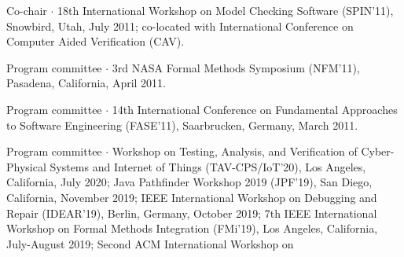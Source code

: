 \documentclass[ComputerScience]{vita}
\begin{document}
\begin{vita}
\begin{Panel and Committee Service}
\item Co-chair $\cdot$ 18th International Workshop on Model Checking Software (SPIN'11), Snowbird, Utah, July 2011; co-located with International Conference on Computer Aided Verification (CAV).
\item Program committee $\cdot$ 3rd NASA Formal Methods Symposium (NFM'11), Pasadena, California, April 2011. 
\item Program committee $\cdot$ 14th International Conference on Fundamental Approaches to Software Engineering (FASE'11), Saarbrucken, Germany, March 2011.
\item Program committee $\cdot$  Workshop on Testing, Analysis, and Verification of Cyber-Physical Systems and Internet of Things (TAV-CPS/IoT'20), Los Angeles, California, July 2020; 
Java Pathfinder Workshop 2019 (JPF'19), San Diego, California,
November 2019; IEEE
  International Workshop on Debugging and Repair (IDEAR'19), Berlin,
  Germany, October 2019; 
7th IEEE International Workshop on
  Formal Methods Integration (FMi'19), Los Angeles, California,
  July-August 2019; 
  Second ACM International Workshop on

\end{Panel and Committee Service}
\end{vita}
\end{document}
